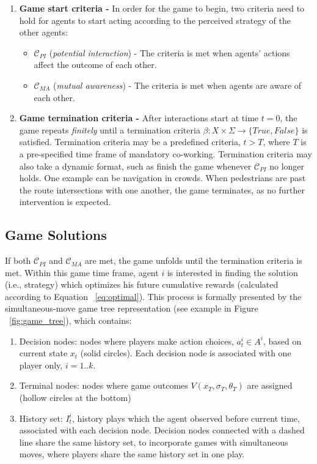 \documentclass[letterpaper, 10 pt, conference]{ieeeconf}  %
\begin{document}
\begin{enumerate}
	\item \textbf{Game start criteria -} In order for the game to begin, two 
    criteria need to hold for agents to start acting according to the 
    perceived strategy of the other agents:
	\begin{itemize}
		\item $\mathcal{C}_{PI}$ (\textit{potential interaction}) - The criteria 
      is met when agents' actions affect the outcome of each other.
		\item $\mathcal{C}_{MA}$ (\textit{mutual awareness}) - The criteria is met when agents are aware of each other.
	\end{itemize} 
	\item \textbf{Game termination criteria -} After interactions start at time 
    $t=0$, the game repeats \textit{finitely} until a termination criteria 
    $\beta: X \times \Sigma \rightarrow \{True,False\}$ is satisfied. 
    Termination criteria may be a predefined criteria, $t>T$, where $T$ is a 
    pre-specified time frame of mandatory co-working. Termination criteria may 
    also take a dynamic format, such as finish the game whenever 
    $\mathcal{C}_{PI}$ no longer holds. One example can be navigation in 
    crowds. When pedestrians are past the route intersections with one 
    another, the 
    game terminates, as no further intervention is expected.
\end{enumerate}


\subsection{Game Solutions}

If both $\mathcal{C}_{PI}$ and $\mathcal{C}_{MA}$ are met, the game unfolds 
until the termination criteria is met. Within this game 
time frame, agent $i$ is interested in finding the solution (i.e., strategy) 
which optimizes his future cumulative rewards (calculated according to Equation 
~\ref{eq:optimal}). This process is formally presented by the 
simultaneous-move game tree representation (see example in Figure 
~\ref{fig:game_tree}), which contains:
\begin{enumerate}
  \item Decision nodes: nodes where players make action choices, 
    $a^i_t \in A^i$, based on current state $x_t$ (solid circles). Each 
    decision node is associated with one player only, $i=1..k$.
  \item Terminal nodes: nodes where game outcomes 
    $V(x_T,\sigma_T,\theta_T)$ are assigned (hollow circles at the bottom)
  \item History set: $I^i_t$, history plays which the agent observed before current 
    time, associated with each decision node. Decision nodes connected with a dashed line share the same history 
    set, to incorporate games with simultaneous moves, where players share the same history set in one play.  
\end{enumerate}
\end{document}
